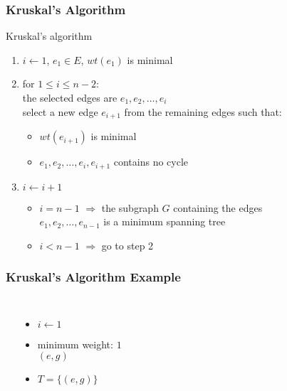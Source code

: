 \documentclass[dvipsnames]{beamer}
\begin{document}
\begin{frame}
  \frametitle{Kruskal's Algorithm}

  \begin{block}{Kruskal's algorithm}
    \begin{enumerate}
      \item $i \leftarrow 1$, $e_1 \in E$, $wt(e_1)$ is minimal

      \pause
      \item for $1 \leq i \leq n-2$:\\
        the selected edges are $e_1,e_2,\dots,e_i$\\
        select a new edge $e_{i+1}$ from the remaining edges such that:
      \begin{itemize}
        \item $wt(e_{i+1})$ is minimal
        \item $e_1,e_2,\dots,e_i,e_{i+1}$ contains no cycle
      \end{itemize}

      \pause
      \item $i \leftarrow i+1$
      \begin{itemize}
        \item $i=n-1$ $\Rightarrow$ the subgraph $G$ containing the edges\\
         $e_1,e_2,\dots,e_{n-1}$ is a minimum spanning tree
        \item $i<n-1$ $\Rightarrow$ go to step 2
      \end{itemize}
    \end{enumerate}
  \end{block}
\end{frame}

\begin{frame}
  \frametitle{Kruskal's Algorithm Example}

  \begin{example}[initialization]
    \begin{columns}
      \begin{center}
      \end{center}

      \pause
      \begin{itemize}
        \item $i \leftarrow 1$
        \item minimum weight: $1$\\
          $(e,g)$

        \pause
        \item $T = \{ (e,g) \}$
      \end{itemize}
    \end{columns}
  \end{example}
\end{frame}
\end{document}
